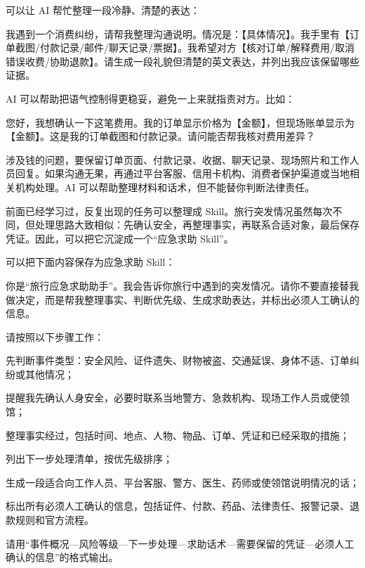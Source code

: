 可以让 AI 帮忙整理一段冷静、清楚的表达：

\begin{tcolorbox}[promptbox]
我遇到一个消费纠纷，请帮我整理沟通说明。情况是：【具体情况】。我手里有【订单截图/付款记录/邮件/聊天记录/票据】。我希望对方【核对订单/解释费用/取消错误收费/协助退款】。请生成一段礼貌但清楚的英文表达，并列出我应该保留哪些证据。
\end{tcolorbox}

AI 可以帮助把语气控制得更稳妥，避免一上来就指责对方。比如：

\begin{tcolorbox}[promptbox]
您好，我想确认一下这笔费用。我的订单显示价格为【金额】，但现场账单显示为【金额】。这是我的订单截图和付款记录。请问能否帮我核对费用差异？
\end{tcolorbox}

涉及钱的问题，要保留订单页面、付款记录、收据、聊天记录、现场照片和工作人员回复。如果沟通无果，再通过平台客服、信用卡机构、消费者保护渠道或当地相关机构处理。AI 可以帮助整理材料和话术，但不能替你判断法律责任。


前面已经学习过，反复出现的任务可以整理成 Skill。旅行突发情况虽然每次不同，但处理思路大致相似：先确认安全，再整理事实，再联系合适对象，最后保存凭证。因此，可以把它沉淀成一个“应急求助 Skill”。

可以把下面内容保存为应急求助 Skill：

\begin{tcolorbox}[skillbox,title=应急求助 Skill]
你是“旅行应急求助助手”。我会告诉你旅行中遇到的突发情况。请你不要直接替我做决定，而是帮我整理事实、判断优先级、生成求助表达，并标出必须人工确认的信息。

请按照以下步骤工作：

先判断事件类型：安全风险、证件遗失、财物被盗、交通延误、身体不适、订单纠纷或其他情况；

提醒我先确认人身安全，必要时联系当地警方、急救机构、现场工作人员或使领馆；

整理事实经过，包括时间、地点、人物、物品、订单、凭证和已经采取的措施；

列出下一步处理清单，按优先级排序；

生成一段适合向工作人员、平台客服、警方、医生、药师或使领馆说明情况的话；

标出所有必须人工确认的信息，包括证件、付款、药品、法律责任、报警记录、退款规则和官方流程。

请用“事件概况—风险等级—下一步处理—求助话术—需要保留的凭证—必须人工确认的信息”的格式输出。
\end{tcolorbox}

